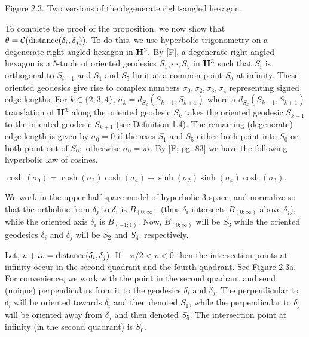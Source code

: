 \noindent 
{}
 \centerline{Figure 2.3. Two versions of the degenerate right-angled hexagon.}
To complete the proof of the proposition, we now show that $\theta =\break{\cal
C}(\distance(\delta_i,\delta_j)).$
To do this, we use hyperbolic trigonometry on a degenerate right-angled
hexagon in ${\bf H}^3.$  
 By [F], a degenerate right-angled
hexagon is a 5-tuple of oriented geodesics $S_1,\cdots, S_5$ in ${\bf H}^3$
such that
$S_i$ is orthogonal to $S_{i+1}$ and $S_1$ and $S_5$ limit at a common
point $S_0$ at
infinity.   These oriented geodesics give rise to complex numbers
$\sigma_0, \sigma_2,\sigma_3, \sigma_4$ representing signed edge lengths.
For $k\in \{2,3,4\}$, $\sigma_k= d_{S_k}(S_{k-1},S_{k+1})$  where a
$d_{S_k}(S_{k-1},S_{k+1})$ translation of ${\bf H}^3$ along the oriented
geodesic $S_k$
takes the oriented geodesic $S_{k-1}$ to the oriented geodesic $S_{k+1}$
(see Definition 1.4).  The remaining (degenerate) edge length is given by
$\sigma_0 = 0$ if the axes $S_1$ and $S_5$ either both point
 into $S_0$ or both point out of $S_0;$  otherwise $\sigma_0=\pi i.$
By [F; pg. 83] we have the following hyperbolic law of cosines.

\centerline{$\cosh(\sigma_0) = \cosh(\sigma_{2}) \cosh(\sigma_{4})
+ \sinh(\sigma_{2}) \sinh(\sigma_{4}) \cosh(\sigma_{3}).$}



We work in the upper-half-space model of hyperbolic 3-space, and normalize
so that the ortholine from $\delta_j$ to $\delta_i$ is $B_{(0;\infty)}$ 
(thus $\delta_i$ intersects $ B_{(0;\infty)}$ above $\delta_j$), while the
oriented axis $\delta_i$ is $ B_{(-1;1)}.$ Now,  $ B_{(0;\infty)}$ will be $S_3$
while the oriented geodesics $\delta_i$ and $\delta_j$ will be $S_2$ and  
$S_4$, respectively.



Let, $u+iv = {\rm distance}(\delta_i,\delta_j).$
  If $-\pi/2 < v < 0$ then the intersection points at infinity occur in the
second quadrant and the fourth quadrant.  See Figure 2.3a.    For
convenience, we work with the point in the second quadrant and send
(unique) perpendiculars from it to the geodesics $\delta_i$ and $\delta_j$.
The perpendicular to $\delta_i$ will be oriented towards $\delta_i$ and
then denoted $S_1$, while the perpendicular to $\delta_j$ will be oriented
away from $\delta_j$ and then denoted $S_5.$  The  intersection point at
infinity (in the second quadrant) is  $S_0.$

 
 


